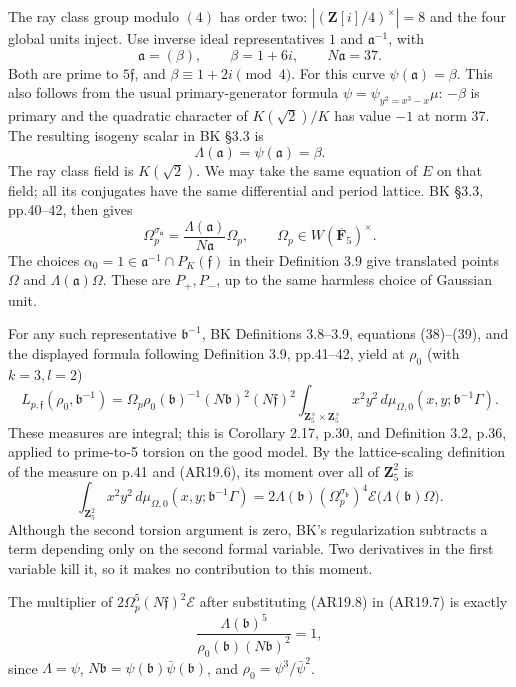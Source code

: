 \documentclass[11pt,a4paper]{article}
\begin{document}
The ray class group modulo \((4)\) has order two:
\(|(\mathbf Z[i]/4)^\times|=8\) and the four global units inject. Use
inverse ideal representatives \(1\) and \(\mathfrak a^{-1}\), with \[
\mathfrak a=(\beta),\qquad \beta=1+6i,\qquad N\mathfrak a=37.
\] Both are prime to \(5\mathfrak f\), and \(\beta\equiv1+2i\pmod4\).
For this curve \(\psi(\mathfrak a)=\beta\). This also follows from the
usual primary-generator formula \(\psi=\psi_{y^2=x^3-x}\mu\): \(-\beta\)
is primary and the quadratic character of \(K(\sqrt2)/K\) has value
\(-1\) at norm 37. The resulting isogeny scalar in BK §3.3 is \[
\Lambda(\mathfrak a)=\psi(\mathfrak a)=\beta.
\] The ray class field is \(K(\sqrt2)\). We may take the same equation
of \(E\) on that field; all its conjugates have the same differential
and period lattice. BK §3.3, pp.40--42, then gives \[
\Omega_p^{\sigma_{\mathfrak a}}
 =\frac{\Lambda(\mathfrak a)}{N\mathfrak a}\Omega_p,
\qquad \Omega_p\in W(\overline{\mathbf F}_5)^\times.
\tag{AR19.6}
\] The choices \(\alpha_0=1\in\mathfrak a^{-1}\cap P_K(\mathfrak f)\) in
their Definition 3.9 give translated points \(\Omega\) and
\(\Lambda(\mathfrak a)\Omega\). These are \(P_+,P_-\), up to the same
harmless choice of Gaussian unit.

For any such representative \(\mathfrak b^{-1}\), BK Definitions
3.8--3.9, equations (38)--(39), and the displayed formula following
Definition 3.9, pp.41--42, yield at \(\rho_0\) (with \(k=3,l=2\)) \[
L_{p,\mathfrak f}(\rho_0,\mathfrak b^{-1})
 =\Omega_p\rho_0(\mathfrak b)^{-1}(N\mathfrak b)^2(N\mathfrak f)^2
 \int_{\mathbf Z_5^\times\times\mathbf Z_5^\times}
       x^2y^2\,d\mu_{\Omega,0}(x,y;\mathfrak b^{-1}\Gamma).
\tag{AR19.7}
\] These measures are integral; this is Corollary 2.17, p.30, and
Definition 3.2, p.36, applied to prime-to-5 torsion on the good model.
By the lattice-scaling definition of the measure on p.41 and (AR19.6),
its moment over all of \(\mathbf Z_5^2\) is \[
\int_{\mathbf Z_5^2}x^2y^2\,d\mu_{\Omega,0}(x,y;\mathfrak b^{-1}\Gamma)
 =2\Lambda(\mathfrak b)
       (\Omega_p^{\sigma_{\mathfrak b}})^4
       \mathcal E\bigl(\Lambda(\mathfrak b)\Omega\bigr).
\tag{AR19.8}
\] Although the second torsion argument is zero, BK's regularization
subtracts a term depending only on the second formal variable. Two
derivatives in the first variable kill it, so it makes no contribution
to this moment.

The multiplier of \(2\Omega_p^5(N\mathfrak f)^2\mathcal E\) after
substituting (AR19.8) in (AR19.7) is exactly \[
\frac{\Lambda(\mathfrak b)^5}
 {\rho_0(\mathfrak b)(N\mathfrak b)^2}=1,
\tag{AR19.9}
\] since \(\Lambda=\psi\),
\(N\mathfrak b=\psi(\mathfrak b)\bar\psi(\mathfrak b)\), and
\(\rho_0=\psi^3/\bar\psi^2\).
\end{document}
